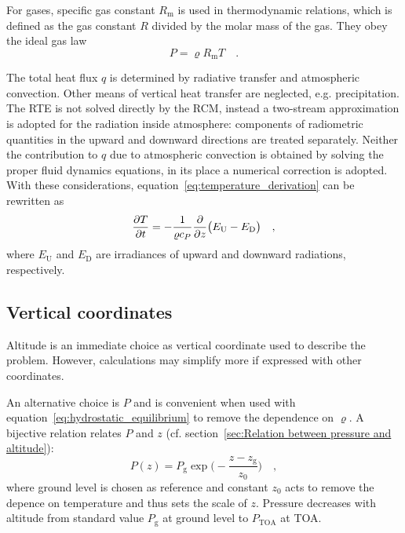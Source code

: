 \documentclass[a4paper,10pt,twocolumn,\classoptions]{article}
\newcommand{\PTOA}{P_\text{TOA}}
\begin{document}
For gases, specific gas constant $R_\text{m}$ is used in thermodynamic relations, which is defined as the gas constant $R$ divided by the molar mass of the gas.
They obey the ideal gas law
\begin{equation}
  \label{eq:ideal_gas_law}
  P = \varrho R_\text{m} T
  \quad .
\end{equation}

The total heat flux $q$ is determined by radiative transfer and atmospheric convection. Other means of vertical heat transfer are neglected, e.g. precipitation. The RTE is not solved directly by the RCM, instead a two-stream approximation is adopted for the radiation inside atmosphere: components of radiometric quantities in the upward and downward directions are treated separately. Neither the contribution to $q$ due to atmospheric convection is obtained by solving the proper fluid dynamics equations, in its place a numerical correction is adopted.
With these considerations, equation~\eqref{eq:temperature_derivation} can be rewritten as
\begin{equation}
  \label{eq:temperature}
  \pdv{T}{t} = -\frac{1}{\varrho c_P} \pdv*{\big( E_\text{U} - E_\text{D} \big)}{z}
  \quad ,
\end{equation}
where $E_\text{U}$ and $E_\text{D}$ are irradiances of upward and downward radiations, respectively.



\subsection{Vertical coordinates}
\label{sec:Vertical coordinates}
Altitude is an immediate choice as vertical coordinate used to describe the problem. However, calculations may simplify more if expressed with other coordinates.

An alternative choice is $P$ and is convenient when used with equation~\eqref{eq:hydrostatic_equilibrium} to remove the dependence on $\varrho$. A bijective relation relates $P$ and $z$ (cf. section~\ref{sec:Relation between pressure and altitude}):
\begin{equation}
  \label{eq:pressure_altitude}
  P(z) = P_\text{g} \exp{\bigg( - \frac{z - z_\text{g}}{z_0} \bigg)}
  \quad ,
\end{equation}
where ground level is chosen as reference and constant $z_0$ acts to remove the depence on temperature and thus sets the scale of $z$. Pressure decreases with altitude from standard value $P_\text{g}$ at ground level to $\PTOA$ at TOA.
\end{document}
